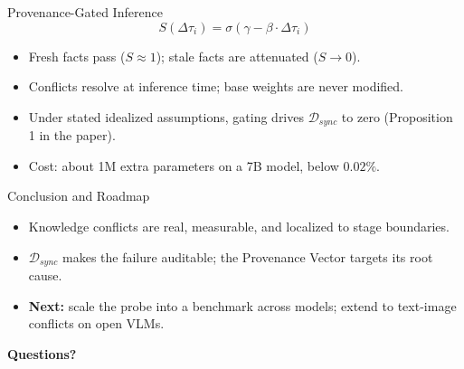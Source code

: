 \documentclass{beamer}
\begin{document}
\begin{frame}{Provenance-Gated Inference}
  \begin{equation*}
    S(\Delta \tau_i) = \sigma(\gamma - \beta \cdot \Delta \tau_i)
  \end{equation*}
  \begin{itemize}
    \item Fresh facts pass ($S \approx 1$); stale facts are attenuated ($S \to 0$).
    \item Conflicts resolve at inference time; base weights are never modified.
    \item Under stated idealized assumptions, gating drives $\mathcal{D}_{sync}$ to zero (Proposition 1 in the paper).
    \item Cost: about 1M extra parameters on a 7B model, below $0.02\%$.
  \end{itemize}
\end{frame}

\begin{frame}{Conclusion and Roadmap}
  \begin{itemize}
    \item Knowledge conflicts are real, measurable, and localized to stage boundaries.
    \item $\mathcal{D}_{sync}$ makes the failure auditable; the Provenance Vector targets its root cause.
    \item \textbf{Next:} scale the probe into a benchmark across models; extend to text-image conflicts on open VLMs.
  \end{itemize}
  \vspace{0.5cm}
  \centering \Large \textbf{Questions?}
\end{frame}
\end{document}
